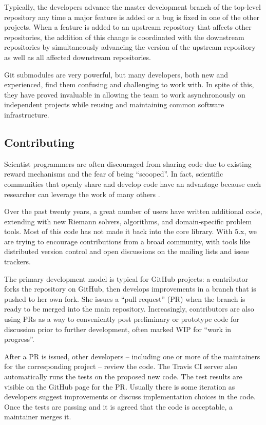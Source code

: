 Typically, the \clawpack developers advance the master development
branch of the top-level repository any time a major feature is added
or a bug is fixed in one of the other projects.  When a feature is
added to an upstream repository that affects other repositories, the
addition of this change is coordinated with the downstream
repositories by simultaneously advancing the version of the upstream
repository as well as all affected downstream repositories.

Git submodules are very powerful, but many developers, both new and
experienced, find them confusing and challenging to work with.
In spite of this, they have proved invaluable in allowing the \clawpack team to
work asynchronously on independent projects while reusing and maintaining
common software infrastructure.

\subsection{Contributing}

Scientist programmers are often discouraged from sharing code
due to existing reward mechanisms and the fear of being ``scooped''.
In fact, scientific communities that openly share and develop code
have an advantage because each researcher can leverage the work of
many others \cite{Turk:2013hd}.

Over the past twenty years, a great number of users have written
additional code, extending \clawpack with new Riemann solvers,
algorithms, and domain-specific problem tools.  Most of this code
has not made it back into the core library.  With \clawpack 5.x,
we are trying to encourage contributions from a broad community, with
tools like distributed version control and open discussions on 
the mailing lists and issue trackers.

The primary development model is typical for GitHub projects: a
contributor forks the repository on GitHub, then develops improvements
in a branch that is pushed to her own fork.  She issues a ``pull
request'' (PR) when the branch is ready to be merged into the main
repository.  Increasingly, contributors are also using PRs as a way to
conveniently post preliminary or prototype code for discussion prior
to further development, often marked WIP for ``work in progress''.

After a PR is issued, other developers -- including one or more of the
maintainers for the corresponding project -- review the code.  The Travis
CI server also automatically runs the tests on the proposed new code.  The test
results are visible on the GitHub page for the PR.  Usually there is
some iteration as developers suggest improvements or discuss
implementation choices in the code.  Once the tests are passing and it
is agreed that the code is acceptable, a maintainer merges it.

